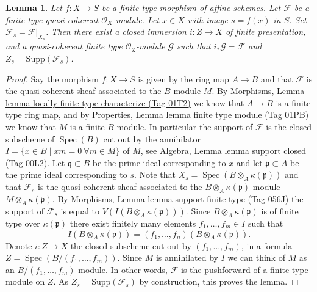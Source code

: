 \documentclass{amsart}
\theoremstyle{plain}
\newtheorem{lemma}[subsection]{Lemma}
\theoremstyle{definition}
\theoremstyle{remark}
\numberwithin{equation}{subsection}
\def\Spec{\mathop{\mathrm{Spec}}}
\begin{document}
\begin{lemma}
\label{lemma-sheaf-lives-on-subscheme}
Let $f : X \to S$ be a finite type morphism of affine schemes.
Let $\mathcal{F}$ be a finite type quasi-coherent $\mathcal{O}_X$-module.
Let $x \in X$ with image $s = f(x)$ in $S$.
Set $\mathcal{F}_s = \mathcal{F}|_{X_s}$.
Then there exist a closed immersion $i : Z \to X$ of finite presentation,
and a quasi-coherent finite type $\mathcal{O}_Z$-module $\mathcal{G}$
such that $i_*\mathcal{G} = \mathcal{F}$ and
$Z_s = \text{Supp}(\mathcal{F}_s)$.
\end{lemma}

\begin{proof}
Say the morphism $f : X \to S$ is given by the ring map
$A \to B$ and that $\mathcal{F}$ is the quasi-coherent sheaf
associated to the $B$-module $M$. By
Morphisms, Lemma \href{https://stacks.math.columbia.edu/tag/01T2}{lemma locally finite type characterize (Tag 01T2)}
we know that $A \to B$ is a finite type ring map, and by
Properties, Lemma \href{https://stacks.math.columbia.edu/tag/01PB}{lemma finite type module (Tag 01PB)}
we know that $M$ is a finite $B$-module. In particular the
support of $\mathcal{F}$ is the closed subscheme of $\Spec(B)$
cut out by the annihilator
$I = \{x \in B \mid xm = 0\ \forall m \in M\}$ of $M$, see
Algebra, Lemma \href{https://stacks.math.columbia.edu/tag/00L2}{lemma support closed (Tag 00L2)}.
Let $\mathfrak q \subset B$ be the prime ideal corresponding to $x$
and let $\mathfrak p \subset A$ be the prime ideal corresponding to $s$.
Note that $X_s = \Spec(B \otimes_A \kappa(\mathfrak p))$ and
that $\mathcal{F}_s$ is the quasi-coherent sheaf associated to the
$B \otimes_A \kappa(\mathfrak p)$ module $M \otimes_A \kappa(\mathfrak p)$. By
Morphisms, Lemma \href{https://stacks.math.columbia.edu/tag/056J}{lemma support finite type (Tag 056J)}
the support of $\mathcal{F}_s$ is equal to
$V(I(B \otimes_A \kappa(\mathfrak p)))$. Since
$B \otimes_A \kappa(\mathfrak p)$ is of finite type over $\kappa(\mathfrak p)$
there exist finitely many elements $f_1, \ldots, f_m \in I$
such that
$$
I(B \otimes_A \kappa(\mathfrak p)) =
(f_1, \ldots, f_n)(B \otimes_A \kappa(\mathfrak p)).
$$
Denote $i : Z \to X$ the closed subscheme cut out by
$(f_1, \ldots, f_m)$, in a formula $Z = \Spec(B/(f_1, \ldots, f_m))$.
Since $M$ is annihilated by $I$ we can think of $M$ as an
$B/(f_1, \ldots, f_m)$-module. In other words, $\mathcal{F}$ is the
pushforward of a finite type module on $Z$.
As $Z_s = \text{Supp}(\mathcal{F}_s)$ by construction, this
proves the lemma.
\end{proof}
\end{document}
